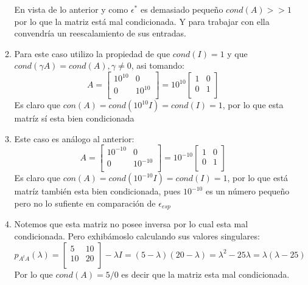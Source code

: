 \documentclass[paper=letter, fontsize=11pt]{scrartcl}
\numberwithin{equation}{section} %
\numberwithin{figure}{section} %
\numberwithin{table}{section} %
\begin{document}
\begin{enumerate}
\begin{enumerate}
En vista de lo anterior y como $\epsilon^*$ es demasiado pequeño $cond(A)>>1$ por lo que la matriz está mal condicionada. Y para trabajar con ella convendría un reescalamiento de sus entradas.




\item Para este caso utilizo la propiedad de que $cond(I)=1$ y que $cond(\gamma A)=cond(A), \gamma \ne 0$, asi tomando:
\[ A = \begin{bmatrix}
10^{10} & 0   \\
0 & 10^{10}\\
\end{bmatrix} = 
10^{10}\begin{bmatrix}
1 & 0   \\
0 & 1\\
\end{bmatrix}
\]
Es claro que $con(A) = cond( 10^{10} I) =cond(I)=1$, por lo que esta matríz sí esta bien condicionada  
\item Este caso es análogo al anterior:
\[ A = \begin{bmatrix}
10^{-10} & 0   \\
0 & 10^{-10}\\
\end{bmatrix} = 
10^{-10}\begin{bmatrix}
1 & 0   \\
0 & 1\\
\end{bmatrix}
\]
Es claro que $con(A) = cond( 10^{-10} I) =cond(I)=1$, por lo que está matríz también esta bien condicionada, pues $10^{-10}$ es un número pequeño pero no lo sufiente en comparación de $\epsilon_{esp}$  

\item Notemos que esta matriz no posee inversa por lo cual esta mal condicionada. Pero exhibámoslo calculando sus valores singulares:
\[p_{A^tA}(\lambda) = 
 \begin{bmatrix}
5& 10   \\
10 & 20\\
\end{bmatrix} -\lambda I  = (5-\lambda)(20-\lambda) = \lambda^2 -25\lambda= \lambda(\lambda-25) 
\]
Por lo que $cond(A) = 5/0$ es decir que la matriz esta mal condicionada.

\end{enumerate}


\end{enumerate}
\end{document}
